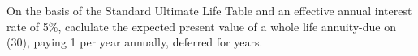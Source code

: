 On the basis of the  Standard Ultimate Life Table and an effective annual interest rate of 5\%, 
caclulate the expected present value of a whole life annuity-due on (30), paying 1 per year annually, deferred for years.

